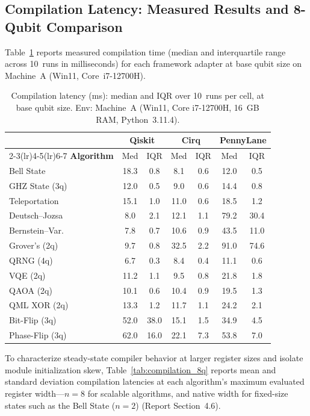 \documentclass[runningheads]{llncs}
\begin{document}
\subsection{Compilation Latency: Measured Results and 8-Qubit Comparison}

Table~\ref{tab:compilation} reports measured compilation time (median and interquartile range across 10~runs in milliseconds) for each framework adapter at base qubit size on Machine~A (Win11, Core~i7-12700H).

\begin{table}[htbp]
\centering
\caption{Compilation latency (ms): median and IQR over 10~runs per cell, at base qubit size. Env: Machine~A (Win11, Core i7-12700H, 16~GB RAM, Python~3.11.4).}
\label{tab:compilation}
\renewcommand{\arraystretch}{1.15}
\setlength{\tabcolsep}{8pt}
\begin{tabular}{@{}lcccccc@{}}
\toprule
 & \multicolumn{2}{c}{\textbf{Qiskit}} & \multicolumn{2}{c}{\textbf{Cirq}} & \multicolumn{2}{c}{\textbf{PennyLane}} \\
\cmidrule(lr){2-3}\cmidrule(lr){4-5}\cmidrule(lr){6-7}
\textbf{Algorithm} & Med & IQR & Med & IQR & Med & IQR \\
\midrule
Bell State      & 18.3 & 0.8 &  8.1 & 0.6 & 12.0 & 0.5 \\
GHZ State (3q)  & 12.0 & 0.5 &  9.0 & 0.6 & 14.4 & 0.8 \\
Teleportation   & 15.1 & 1.0 & 11.0 & 0.6 & 18.5 & 1.2 \\
Deutsch--Jozsa  &  8.0 & 2.1 & 12.1 & 1.1 & 79.2 & 30.4 \\
Bernstein--Var. &  7.8 & 0.7 & 10.6 & 0.9 & 43.5 & 11.0 \\
Grover's (2q)   &  9.7 & 0.8 & 32.5 & 2.2 & 91.0 & 74.6 \\
QRNG (4q)       &  6.7 & 0.3 &  8.4 & 0.4 & 11.1 & 0.6 \\
VQE (2q)        & 11.2 & 1.1 &  9.5 & 0.8 & 21.8 & 1.8 \\
QAOA (2q)       & 10.1 & 0.6 & 10.4 & 0.9 & 19.5 & 1.3 \\
QML XOR (2q)    & 13.3 & 1.2 & 11.7 & 1.1 & 24.2 & 2.1 \\
Bit-Flip (3q)   & 52.0 & 38.0 & 15.1 & 1.5 & 34.9 & 4.5 \\
Phase-Flip (3q) & 62.0 & 16.0 & 22.1 & 7.3 & 53.8 & 7.0 \\
\bottomrule
\end{tabular}
\end{table}

To characterize steady-state compiler behavior at larger register sizes and isolate module initialization skew, Table~\ref{tab:compilation_8q} reports mean and standard deviation compilation latencies at each algorithm's maximum evaluated register width---$n=8$ for scalable algorithms, and native width for fixed-size states such as the Bell State ($n=2$) (Report Section~4.6).
\end{document}
